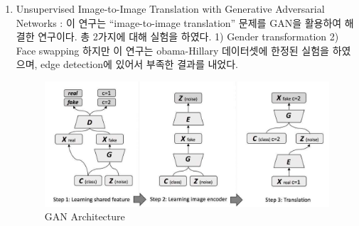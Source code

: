 \documentclass[chapter,oneside]{oblivoir}
\begin{document}
\begin{enumerate}
\item Unsupervised Image-to-Image Translation with Generative Adversarial Networks : 이 연구는 “image-to-image translation” 문제를 GAN을 활용하여 해결한 연구이다. 총 2가지에 대해 실험을 하였다. 1) Gender transformation 2) Face swapping 하지만 이 연구는 obama-Hillary 데이터셋에 한정된 실험을 하였으며, edge detection에 있어서 부족한 결과를 내었다.

\begin{figure}[h!]
    \centering
      \includegraphics[scale = 0.7]{pic/chp1/img613}
    \caption{ GAN Architecture\cite{reference5}}
\end{figure}

\end{enumerate}
\end{document}
